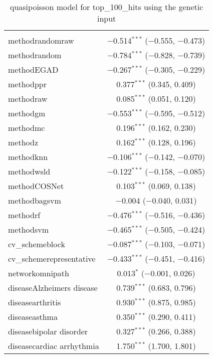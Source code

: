 
\begin{table}[!htbp] \centering 
  \caption{quasipoisson model for top_100_hits using the genetic input} 
  \label{} 
\begin{tabular}{@{\extracolsep{5pt}}lc} 
\\[-1.8ex]\hline 
\hline \\[-1.8ex] 
 methodrandomraw & $-$0.514$^{***}$ ($-$0.555, $-$0.473) \\ 
  methodrandom & $-$0.784$^{***}$ ($-$0.828, $-$0.739) \\ 
  methodEGAD & $-$0.267$^{***}$ ($-$0.305, $-$0.229) \\ 
  methodppr & 0.377$^{***}$ (0.345, 0.409) \\ 
  methodraw & 0.085$^{***}$ (0.051, 0.120) \\ 
  methodgm & $-$0.553$^{***}$ ($-$0.595, $-$0.512) \\ 
  methodmc & 0.196$^{***}$ (0.162, 0.230) \\ 
  methodz & 0.162$^{***}$ (0.128, 0.196) \\ 
  methodknn & $-$0.106$^{***}$ ($-$0.142, $-$0.070) \\ 
  methodwsld & $-$0.122$^{***}$ ($-$0.158, $-$0.085) \\ 
  methodCOSNet & 0.103$^{***}$ (0.069, 0.138) \\ 
  methodbagsvm & $-$0.004 ($-$0.040, 0.031) \\ 
  methodrf & $-$0.476$^{***}$ ($-$0.516, $-$0.436) \\ 
  methodsvm & $-$0.465$^{***}$ ($-$0.505, $-$0.424) \\ 
  cv\_schemeblock & $-$0.087$^{***}$ ($-$0.103, $-$0.071) \\ 
  cv\_schemerepresentative & $-$0.433$^{***}$ ($-$0.451, $-$0.416) \\ 
  networkomnipath & 0.013$^{*}$ ($-$0.001, 0.026) \\ 
  diseaseAlzheimers disease & 0.739$^{***}$ (0.683, 0.796) \\ 
  diseasearthritis & 0.930$^{***}$ (0.875, 0.985) \\ 
  diseaseasthma & 0.350$^{***}$ (0.290, 0.411) \\ 
  diseasebipolar disorder & 0.327$^{***}$ (0.266, 0.388) \\ 
  diseasecardiac arrhythmia & 1.750$^{***}$ (1.700, 1.801) \\ 

\end{tabular}
\end{table}
